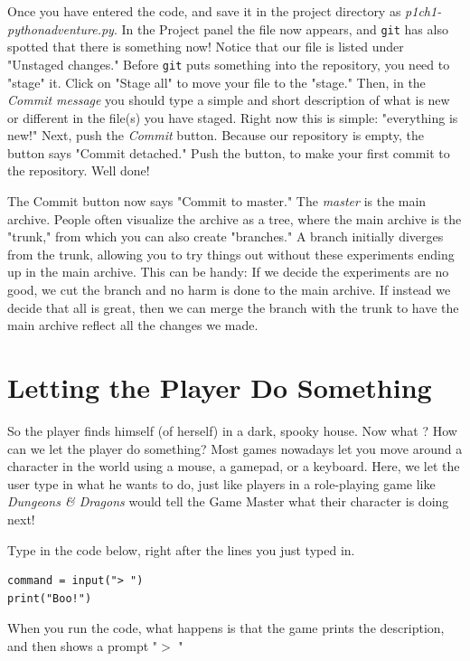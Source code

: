 Once you have entered the code, and save it in the project directory as \emph{p1ch1-pythonadventure.py}. In the Project panel the file now appears, and \texttt{git} has also spotted that there is something now! Notice that our file is listed under "Unstaged changes." Before \texttt{git} puts something into the repository, you need to "stage" it. Click on "Stage all" to move your file to the "stage." Then, in the \emph{Commit message} you should type a simple and short description of what is new or different in the file(s) you have staged. Right now this is simple: "everything is new!" Next, push the \emph{Commit} button. Because our repository is empty, the button says "Commit detached." Push the button, to make your first commit to the repository. Well done!

\begin{Exp} 
The Commit button now says "Commit to master." The \emph{master} is the main archive. People often visualize the archive as a tree, where the main archive is the "trunk," from which you can also create "branches." A branch initially diverges from the trunk, allowing you to try things out without these experiments ending up in the main archive. This can be handy: If we decide the experiments are no good, we cut the branch and no harm is done to the main archive. If instead we decide that all is great, then we can merge the branch with the trunk to have the main archive reflect all the changes we made.      \expend 
\end{Exp}
 
\section{Letting the Player Do Something}

So the player finds himself (of herself) in a dark, spooky house. Now what ? How can we let the player do something? Most games nowadays let you move around a character in the world using a mouse, a gamepad, or a keyboard. Here, we let the user type in what he wants to do, just like players in a role-playing game like \emph{Dungeons \& Dragons} would tell the Game Master what their character is doing next! 

Type in the code below, right after the lines you just typed in. 

\begin{lstlisting}[firstnumber=last]
command = input("> ")
print("Boo!")
\end{lstlisting}

When you run the code, what happens is that the game prints the description, and then shows a prompt "$>$ " 
   
   
   
   
   
   